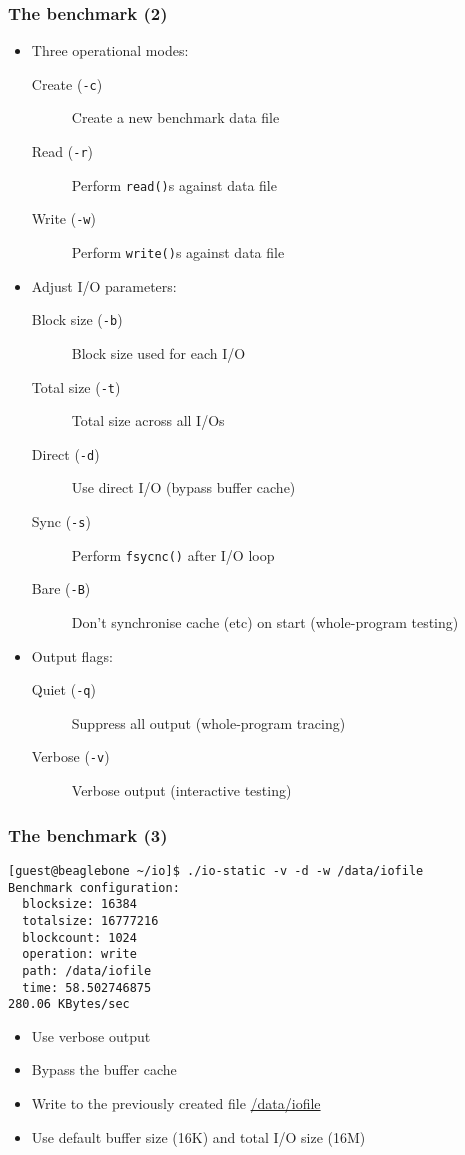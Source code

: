 \begin{frame}
  \frametitle{The benchmark (2)}

  \begin{itemize}
    \item Three operational modes:
    \begin{description}
      \item[Create (\texttt{-c})] Create a new benchmark data file
      \item[Read (\texttt{-r})] Perform \texttt{read()}s against data file
      \item[Write (\texttt{-w})] Perform \texttt{write()}s against data file
    \end{description}
    \pause
    \item Adjust I/O parameters:
    \begin{description}
      \item[Block size (\texttt{-b})] Block size used for each I/O
      \item[Total size (\texttt{-t})] Total size across all I/Os
      \item[Direct (\texttt{-d})] Use direct I/O (bypass buffer cache)
      \item[Sync (\texttt{-s})] Perform \texttt{fsycnc()} after I/O loop
      \item[Bare (\texttt{-B})] Don't synchronise cache (etc) on start
	(whole-program testing)
    \end{description}
    \pause
    \item Output flags:
    \begin{description}
      \item[Quiet (\texttt{-q})] Suppress all output (whole-program tracing)
      \item[Verbose (\texttt{-v})] Verbose output (interactive testing)
    \end{description}
  \end{itemize}
\end{frame}

\begin{frame}[fragile]
  \frametitle{The benchmark (3)}

  \begin{scriptsize}
\begin{verbatim}
[guest@beaglebone ~/io]$ ./io-static -v -d -w /data/iofile 
Benchmark configuration:
  blocksize: 16384
  totalsize: 16777216
  blockcount: 1024
  operation: write
  path: /data/iofile
  time: 58.502746875
280.06 KBytes/sec
\end{verbatim}
  \end{scriptsize}

  \begin{itemize}
    \item Use verbose output
    \item Bypass the buffer cache
    \item Write to the previously created file \url{/data/iofile}
    \item Use default buffer size (16K) and total I/O size (16M)
  \end{itemize}
\end{frame}


